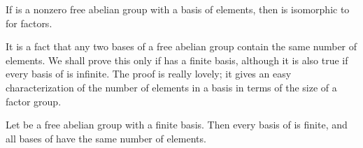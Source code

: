 \documentclass[11pt,oneside]{article}
\begin{document}
\begin{BookBody}
 If  is a nonzero free abelian group with a basis of  elements, then  is isomorphic to  for  factors.

It is a fact that any two bases of a free abelian group  contain the same number of elements. We shall prove this only if  has a finite basis, although it is also true if every basis of  is infinite. The proof is really lovely; it gives an easy characterization of the number of elements in a basis in terms of the size of a factor group.

 Let  be a free abelian group with a finite basis. Then every basis of  is finite, and all bases of  have the same number of elements.

\end{BookBody}

\BookNarrativetrue
\end{document}
